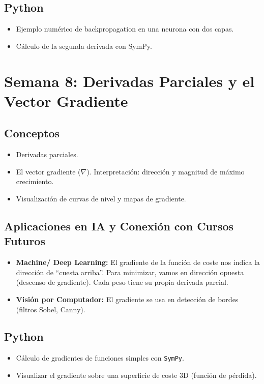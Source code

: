\documentclass[12pt,a4paper,openany,oneside]{book}
\begin{document}
\subsection{Python}
\begin{itemize}
    \item Ejemplo numérico de backpropagation en una neurona con dos capas.
    \item Cálculo de la segunda derivada con SymPy.
\end{itemize}

\section{Semana 8: Derivadas Parciales y el Vector Gradiente}

\subsection{Conceptos}
\begin{itemize}
    \item Derivadas parciales.
    \item El vector gradiente (\(\nabla\)). Interpretación: dirección y magnitud de máximo crecimiento.
    \item Visualización de curvas de nivel y mapas de gradiente.
\end{itemize}

\subsection{Aplicaciones en IA y Conexión con Cursos Futuros}
\begin{itemize}
    \item \textbf{Machine/ Deep Learning:} El gradiente de la función de coste nos indica la dirección de ``cuesta arriba''. Para minimizar, vamos en dirección opuesta (descenso de gradiente). Cada peso tiene su propia derivada parcial.
    \item \textbf{Visión por Computador:} El gradiente se usa en detección de bordes (filtros Sobel, Canny).
\end{itemize}

\subsection{Python}
\begin{itemize}
    \item Cálculo de gradientes de funciones simples con \texttt{SymPy}.
    \item Visualizar el gradiente sobre una superficie de coste 3D (función de pérdida).
\end{itemize}
\end{document}
